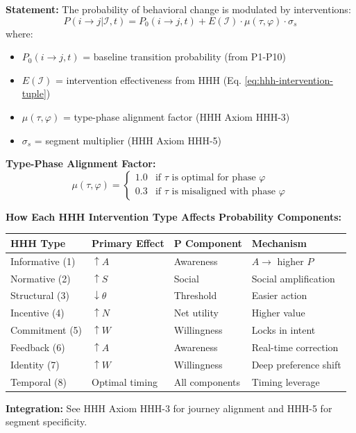 \documentclass[11pt, a4paper]{article}
\begin{document}
\begin{tcolorbox}[colback=orange!5!white, colframe=orange!75!black,
    title=\textbf{Axiom P11: Intervention Modulation (NEW)}]

\textbf{Statement:} The probability of behavioral change is modulated by interventions:
\begin{equation}
P(i \to j | \mathcal{I}, t) = P_0(i \to j, t) + E(\mathcal{I}) \cdot \mu(\tau, \varphi) \cdot \sigma_s
\label{eq:bc-intervention-modulation}
\end{equation}
where:
\begin{itemize}[nosep]
\item $P_0(i \to j, t)$ = baseline transition probability (from P1-P10)
\item $E(\mathcal{I})$ = intervention effectiveness from HHH (Eq. \ref{eq:hhh-intervention-tuple})
\item $\mu(\tau, \varphi)$ = type-phase alignment factor (HHH Axiom HHH-3)
\item $\sigma_s$ = segment multiplier (HHH Axiom HHH-5)
\end{itemize}

\textbf{Type-Phase Alignment Factor:}
\begin{equation}
\mu(\tau, \varphi) = \begin{cases}
1.0 & \text{if } \tau \text{ is optimal for phase } \varphi \\
0.3 & \text{if } \tau \text{ is misaligned with phase } \varphi
\end{cases}
\end{equation}

\textbf{How Each HHH Intervention Type Affects Probability Components:}
\begin{center}
\renewcommand{\arraystretch}{1.2}
\begin{tabular}{@{}llll@{}}
\toprule
\textbf{HHH Type} & \textbf{Primary Effect} & \textbf{P Component} & \textbf{Mechanism} \\
\midrule
Informative (1) & $\uparrow A$ & Awareness & $A \to$ higher $P$ \\
Normative (2) & $\uparrow S$ & Social & Social amplification \\
Structural (3) & $\downarrow \theta$ & Threshold & Easier action \\
Incentive (4) & $\uparrow N$ & Net utility & Higher value \\
Commitment (5) & $\uparrow W$ & Willingness & Locks in intent \\
Feedback (6) & $\uparrow A$ & Awareness & Real-time correction \\
Identity (7) & $\uparrow W$ & Willingness & Deep preference shift \\
Temporal (8) & Optimal timing & All components & Timing leverage \\
\bottomrule
\end{tabular}
\end{center}

\textbf{Integration:} See HHH Axiom HHH-3 for journey alignment and HHH-5 for segment specificity.

\end{tcolorbox}
\end{document}
